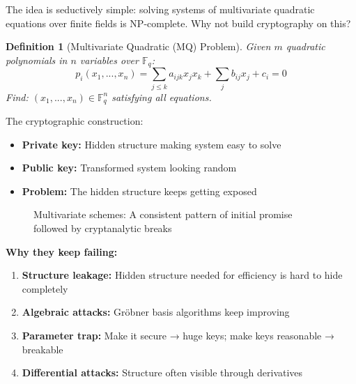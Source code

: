 \documentclass[11pt,a4paper]{article}
\newtheorem{definition}{Definition}
\begin{document}
The idea is seductively simple: solving systems of multivariate quadratic equations over finite fields is NP-complete. Why not build cryptography on this?

\begin{definition}[Multivariate Quadratic (MQ) Problem]
Given $m$ quadratic polynomials in $n$ variables over $\mathbb{F}_q$:
$$p_i(x_1, ..., x_n) = \sum_{j \leq k} a_{ijk} x_j x_k + \sum_j b_{ij} x_j + c_i = 0$$
Find: $(x_1, ..., x_n) \in \mathbb{F}_q^n$ satisfying all equations.
\end{definition}

The cryptographic construction:
\begin{itemize}
    \item \textbf{Private key:} Hidden structure making system easy to solve
    \item \textbf{Public key:} Transformed system looking random
    \item \textbf{Problem:} The hidden structure keeps getting exposed
\end{itemize}

\begin{figure}[h]
\centering
{}
\caption{Multivariate schemes: A consistent pattern of initial promise followed by cryptanalytic breaks}
\end{figure}

\textbf{Why they keep failing:}
\begin{enumerate}
    \item \textbf{Structure leakage:} Hidden structure needed for efficiency is hard to hide completely
    \item \textbf{Algebraic attacks:} Gröbner basis algorithms keep improving
    \item \textbf{Parameter trap:} Make it secure → huge keys; make keys reasonable → breakable
    \item \textbf{Differential attacks:} Structure often visible through derivatives
\end{enumerate}
\end{document}
